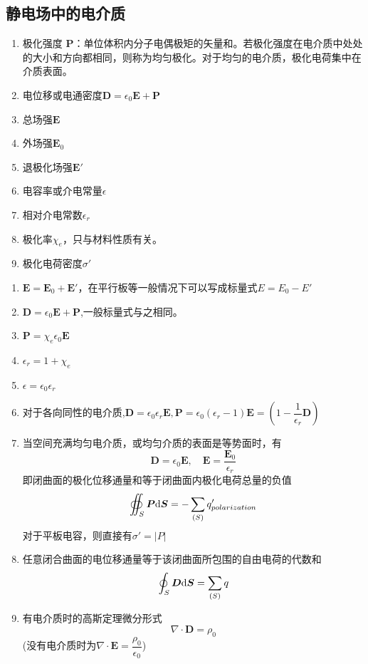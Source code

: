\subsection{静电场中的电介质}
\begin{enumerate}
	\item 极化强度 $ \bm{P} $：单位体积内分子电偶极矩的矢量和。若极化强度在电介质中处处的大小和方向都相同，则称为均匀极化。对于均匀的电介质，极化电荷集中在介质表面。
	\item 电位移或电通密度$ \bm{D}=\epsilon_0\bm{E}+\bm{P} $
	\item 总场强$ \bm{E} $
	\item 外场强$ \bm{E}_0 $
	\item 退极化场强$ \bm{E}' $
	\item 电容率或介电常量$ \epsilon $
	\item 相对介电常数$ \epsilon_r $
	\item 极化率$ \chi_e $，只与材料性质有关。
	\item 极化电荷密度$ \sigma' $
\end{enumerate}
\begin{enumerate}
	\item $ \bm{E}=\bm{E}_0+\bm{E}' $，在平行板等一般情况下可以写成标量式$ E=E_0-E' $
	\item $ \bm{D}=\epsilon_0\bm{E }+\bm{P}$,一般标量式与之相同。
	\item $ \bm{P}=\chi_e\epsilon_0\bm{E} $
	\item $ \epsilon_r=1+\chi_e $
	\item $ \epsilon=\epsilon_0\epsilon_r $
	\item 对于各向同性的电介质,$ \bm{D}=\epsilon_0\epsilon_r\bm{E} ,\bm{P}=\epsilon_0(\epsilon_r-1)\bm{E}=(1-\dfrac{1}{\epsilon_r}\bm{D})$
	\item 当空间充满均匀电介质，或均匀介质的表面是等势面时，有
	\begin{equation}\label{key}
		\bm{D}=\epsilon_0\bm{E},	\quad \bm{E}=\dfrac{\bm{E}_0}{\epsilon_r}
	\end{equation}即闭曲面的极化位移通量和等于闭曲面内极化电荷总量的负值
\begin{equation}\label{key}
	\oiint_{S}\bm{P}\mathrm{d} \bm{S}=-\sum_{(S)}q'_{polarization}
\end{equation}
对于平板电容，则直接有$ \sigma'=|P| $
\item  任意闭合曲面的电位移通量等于该闭曲面所包围的自由电荷的代数和
\begin{equation}\label{key}
		\oint_{S}\bm{D}\mathrm{d} \bm{S}=\sum_{(S)}q
\end{equation}
\item 有电介质时的高斯定理微分形式
\begin{equation}\label{key}
	\nabla\cdot \bm{D}=\rho_0
\end{equation}
(没有电介质时为$ 	\nabla\cdot \bm{E}=\dfrac{\rho_0}{\epsilon_0}  $)
\end{enumerate}

